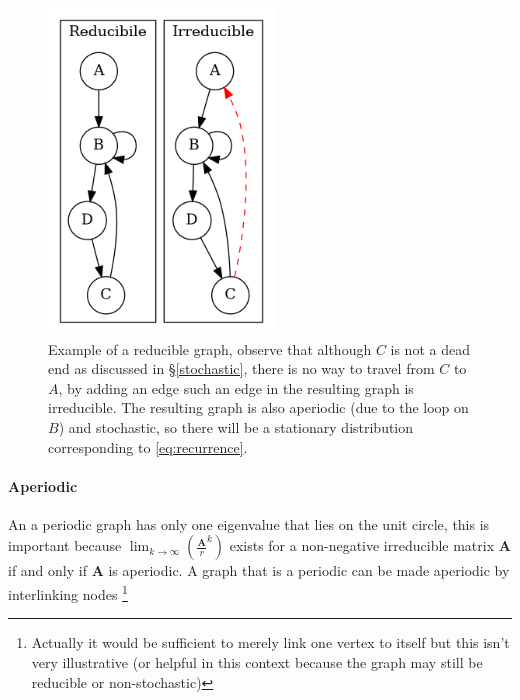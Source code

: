 \documentclass[11pt]{article}
\begin{document}
\begin{figure}[htbp]
\centering
\includegraphics[width=6cm]{media/dot/reducible_graph_example.dot.png}
\caption{\label{irreducible-example}Example of a reducible graph, observe that although \(C\) is not a dead end as discussed in \S \ref{stochastic}, there is no way to travel from \(C\) to \(A\), by adding an edge such an edge in the resulting graph is irreducible. The resulting graph is also aperiodic (due to the loop on \(B\)) and stochastic, so there will be a stationary distribution corresponding to \eqref{eq:recurrence}.}
\end{figure}

\paragraph{Aperiodic}
\label{sec:orge7c4a93}
An a periodic graph has only one eigenvalue that lies on the unit circle, this is important because \(\lim_{k\rightarrow \infty} \left( \frac{\mathbf{A}}{r}^{k} \right)\) exists for a non-negative irreducible matrix \(\mathbf{A}\) if and only if \(\mathbf{A}\) is aperiodic. A graph that is a periodic can be made aperiodic by interlinking nodes \footnote{Actually it would be sufficient to merely link one vertex to itself \cite[]{langvilleGooglePageRankScience2012} but this isn't very illustrative (or helpful in this context because the graph may still be reducible or non-stochastic)}
\end{document}
